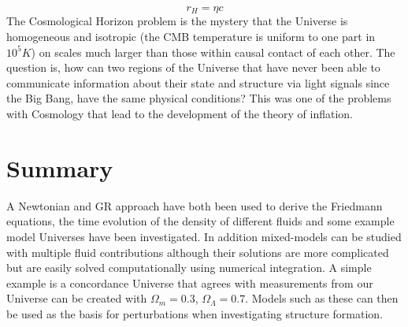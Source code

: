 \documentclass[12pt]{article} %
\begin{document}
\begin{equation}
r_{H} = \eta c
\end{equation}
The Cosmological Horizon problem is the mystery that the Universe is homogeneous and isotropic (the CMB temperature is uniform to one part in $10^5 K$) on scales much larger than those within causal contact of each other. The question is, how can two regions of the Universe that have never been able to communicate information about their state and structure via light signals since the Big Bang, have the same physical conditions? This was one of the problems with Cosmology that lead to the development of the theory of inflation\cite{coles}.

\section{Summary}

A Newtonian and GR approach have both been used to derive the Friedmann equations, the time evolution of the density of different fluids and some example model Universes have been investigated. In addition mixed-models can be studied with multiple fluid contributions although their solutions are more complicated but are easily solved computationally using numerical integration. A simple example is a concordance Universe that agrees with measurements from our Universe can be created with $\Omega_{m}=0.3$, $\Omega_{\Lambda}=0.7$. Models such as these can then be used as the basis for perturbations when investigating structure formation.



\newpage
\end{document}
